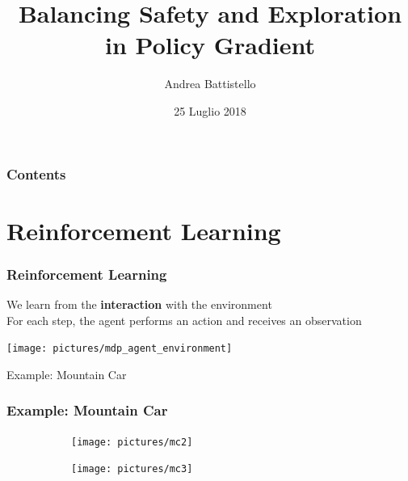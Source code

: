 \documentclass{beamer}
\title[Balancing Safety and Exploration]{Balancing Safety and Exploration in Policy Gradient}
\author[Andrea Battistello]{Andrea Battistello}
\institute[PoliMI]{Politecnico di Milano}
\date[25/07/2018]{25 Luglio 2018}
\begin{document}
\frame{\titlepage}





\begin{frame}
\frametitle{Contents}
\tableofcontents
\end{frame}


\section{Reinforcement Learning}

\begin{frame}
\frametitle{Reinforcement Learning}

We learn from the \textbf{interaction} with the environment \\
For each step, the agent performs an action and receives an observation

\vfill

\centering
\texttt{[image: pictures/mdp\_agent\_environment]}

\end{frame}


\begin{frame}{Example: Mountain Car}
\centering 

\end{frame}


\begin{frame}
\frametitle{Example: Mountain Car}
\begin{figure}[t]
\begin{subfigure}{0.49\textwidth}
\texttt{[image: pictures/mc2]}
\end{subfigure}
\hfill
\begin{subfigure}{0.49\textwidth}
\texttt{[image: pictures/mc3]}
\end{subfigure}
\end{figure}
\end{frame}
\end{document}
